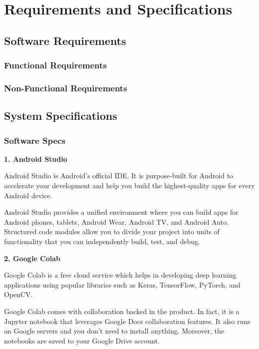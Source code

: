 \documentclass[../Report.tex]{subfiles}
\begin{document}
\chapter{Requirements and  Specifications}

\section{Software Requirements}

\subsection{Functional Requirements}

\subsection{Non-Functional Requirements}

\section{System Specifications}

\subsection{Software Specs}

\textbf{1. Android Studio}

Android Studio is Android's official IDE. 
It is purpose-built for Android to accelerate your development and help you build the highest-quality apps for every Android device.\par

Android Studio provides a unified environment where you can build apps for 
Android phones, tablets, Android Wear, Android TV, and Android Auto.
Structured code modules allow you to divide your project into units of functionality 
that you can independently build, test, and debug.\par

\textbf{2. Google Colab}

Google Colab is a free cloud service which helps in developing deep learning applications 
using popular libraries such as Keras, TensorFlow, PyTorch, and OpenCV.\par


Google Colab comes with collaboration backed in the product. 
In fact, it is a Jupyter notebook that leverages Google Docs collaboration features. 
It also runs on Google servers and you don’t need to install anything. 
Moreover, the notebooks are saved to your Google Drive account.\par
\end{document}
